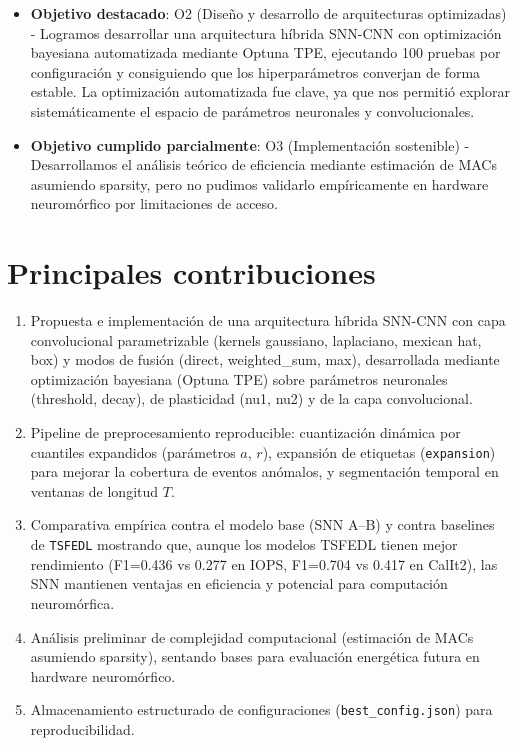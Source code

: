 \begin{itemize}
    \item \textbf{Objetivo destacado}: O2 (Diseño y desarrollo de arquitecturas optimizadas) - Logramos desarrollar una arquitectura híbrida SNN-CNN con optimización bayesiana automatizada mediante Optuna TPE, ejecutando 100 pruebas por configuración y consiguiendo que los hiperparámetros converjan de forma estable. La optimización automatizada fue clave, ya que nos permitió explorar sistemáticamente el espacio de parámetros neuronales y convolucionales.
    \item \textbf{Objetivo cumplido parcialmente}: O3 (Implementación sostenible) - Desarrollamos el análisis teórico de eficiencia mediante estimación de MACs asumiendo sparsity, pero no pudimos validarlo empíricamente en hardware neuromórfico por limitaciones de acceso.
\end{itemize}

\section{Principales contribuciones}
\begin{enumerate}
    \item Propuesta e implementación de una arquitectura híbrida SNN-CNN con capa convolucional parametrizable (kernels gaussiano, laplaciano, mexican hat, box) y modos de fusión (direct, weighted\_sum, max), desarrollada mediante optimización bayesiana (Optuna TPE) sobre parámetros neuronales (threshold, decay), de plasticidad (nu1, nu2) y de la capa convolucional.
    \item Pipeline de preprocesamiento reproducible: cuantización dinámica por cuantiles expandidos (parámetros \(a\), \(r\)), expansión de etiquetas (\texttt{expansion}) para mejorar la cobertura de eventos anómalos, y segmentación temporal en ventanas de longitud \(T\).
    \item Comparativa empírica contra el modelo base (SNN A--B) y contra baselines de \texttt{TSFEDL} mostrando que, aunque los modelos TSFEDL tienen mejor rendimiento (F1=0.436 vs 0.277 en IOPS, F1=0.704 vs 0.417 en CalIt2), las SNN mantienen ventajas en eficiencia y potencial para computación neuromórfica.
    \item Análisis preliminar de complejidad computacional (estimación de MACs asumiendo sparsity), sentando bases para evaluación energética futura en hardware neuromórfico.
    \item Almacenamiento estructurado de configuraciones (\texttt{best\_config.json}) para reproducibilidad.
\end{enumerate}

